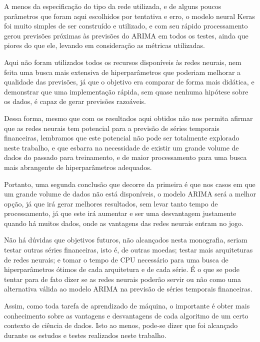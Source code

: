 A menos da especificação do tipo da rede utilizada, e de alguns poucos parâmetros que foram aqui escolhidos por tentativa e erro, o modelo neural Keras foi muito simples de ser construído e utilizado, e com seu rápido processamento gerou previsões próximas às previsões do ARIMA em todos os testes, ainda que piores do que ele, levando em consideração as métricas utilizadas.

Aqui não foram utilizados todos os recursos disponíveis às redes neurais, nem feita uma busca mais extensiva de hiperparâmetros que poderiam melhorar a qualidade das previsões, já que o objetivo era comparar de forma mais didática, e demonstrar que uma implementação rápida, sem quase nenhuma hipótese sobre os dados, é capaz de gerar previsões razoáveis.

Dessa forma, mesmo que com os resultados aqui obtidos não nos permita afirmar que as redes neurais tem potencial para a previsão de séries temporais financeiras, lembramos que este potencial não pode ser totalmente explorado neste trabalho, e que esbarra na necessidade de existir um grande volume de dados do passado para treinamento, e de maior processamento para uma busca mais abrangente de hiperparâmetros adequados.

Portanto, uma segunda conclusão que decorre da primeira é que nos casos em que um grande volume de dados não está disponíveis, o modelo ARIMA será a melhor opção, já que irá gerar melhores resultados, sem levar tanto tempo de processamento, já que este irá aumentar e ser uma desvantagem justamente quando há muitos dados, onde as vantagens das redes neurais entram no jogo.

Não há dúvidas que objetivos futuros, não alcançados nesta monografia, seriam testar outras séries financeiras, isto é, de outras moedas; testar mais arquiteturas de redes neurais; e tomar o tempo de CPU necessário para uma busca de hiperparâmetros ótimos de cada arquitetura e de cada série. É o que se pode tentar para de fato dizer se as redes neurais poderão servir ou não como uma alternativa válida ao modelo ARIMA na previsão de séries temporais financeiras.

Assim, como toda tarefa de aprendizado de máquina, o importante é obter mais conhecimento sobre as vantagens e desvantagens de cada algoritmo de um certo contexto de ciência de dados. Isto ao menos, pode-se dizer que foi alcançado durante os estudos e testes realizados neste trabalho.
